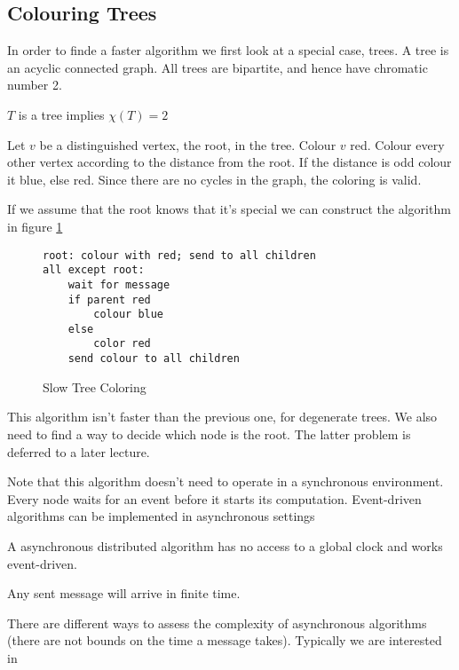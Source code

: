 \subsection{Colouring Trees}

In order to finde a faster algorithm we first look at a special case, trees. A tree is an acyclic connected graph. All trees are bipartite, and hence have chromatic number 2.

\begin{thm} $T$ is a tree implies $\chi(T)=2$ \end{thm}

\begin{pr} Let $v$ be a distinguished vertex, the root, in the tree. Colour $v$ red.  Colour every other vertex according to the distance from the root. If the distance is odd colour it blue, else red. Since there are no cycles in the graph, the coloring is valid.
\end{pr}

If we assume that the root knows that it's special we can construct the algorithm in figure \ref{alg:slow_tree_colour}

\begin{figure}[hbt]
\begin{lstlisting}
root: colour with red; send to all children
all except root: 
	wait for message
	if parent red
		colour blue
	else
		color red
	send colour to all children
\end{lstlisting}
\caption{Slow Tree Coloring}
\label{alg:slow_tree_colour}
\end{figure}


This algorithm isn't faster than the previous one, for degenerate trees. We also need to find a way to decide which node is the root. The latter problem is deferred to a later lecture.

Note that this algorithm doesn't need to operate in a synchronous environment. Every node waits for an event before it starts its computation. Event-driven algorithms can be implemented in asynchronous settings

\begin{Def}[Asynchronous DA] A asynchronous distributed algorithm has no access to a global clock and works event-driven.

Any sent message will arrive in finite time.
\end{Def}

There are different ways to assess the complexity of asynchronous algorithms (there are not bounds on the time a message takes). Typically we are interested in 

